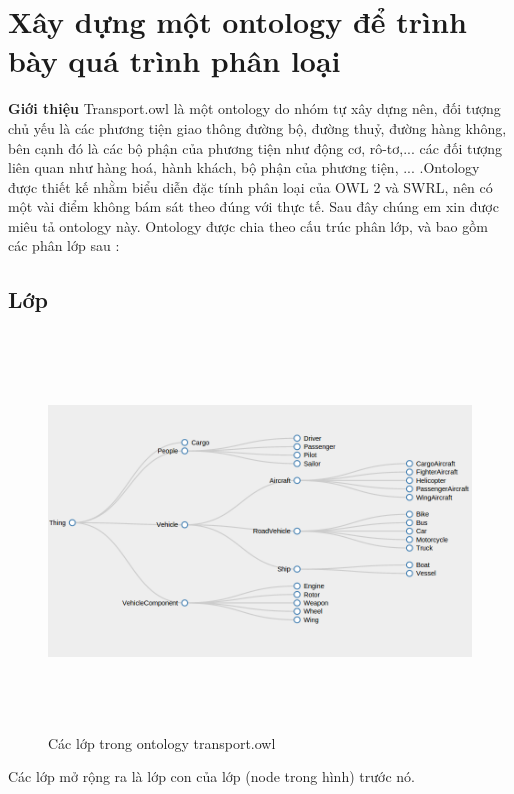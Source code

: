 {\section{Xây dựng một ontology để trình bày quá trình phân loại}
\textbf{Giới thiệu} Transport.owl \cite{owleditorSrc} là một ontology do nhóm tự xây dựng nên, đối tượng chủ yếu là các phương tiện giao thông đường bộ, đường thuỷ, đường hàng không, bên cạnh đó là các bộ phận của phương tiện như động cơ, rô-tơ,... các đối tượng liên quan như hàng hoá, hành khách, bộ phận của phương tiện, ... .Ontology được thiết kế nhằm biểu diễn đặc tính phân loại của OWL 2 và SWRL, nên có một vài điểm không bám sát theo đúng với thực tế. Sau đây chúng em xin được miêu tả ontology này.
Ontology được chia theo cấu trúc phân lớp, và bao gồm các phân lớp sau :
\subsection{Lớp}
\begin{figure}[h!]
	\centering
	\includegraphics[width=155mm,height=105mm]{Figures/transport_cls.png}
	\caption{Các lớp trong ontology transport.owl\label{overflow}}
\end{figure}
Các lớp mở rộng ra là lớp con của lớp (node trong hình) trước nó.
}
